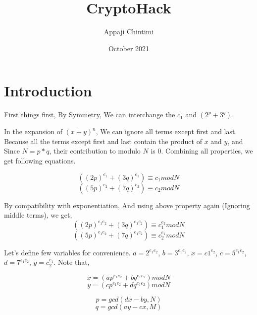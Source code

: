 \documentclass{article}
\title{CryptoHack}
\author{Appaji Chintimi}
\date{October 2021}
\begin{document}
\maketitle

\section{Introduction}

First things first, By Symmetry, We can interchange the $c_1$ and $(2^p + 3^q)$.

In the expansion of $(x + y)^n$, We can ignore all terms except first and last. Because all the terms except first and last contain the product of $x$ and $y$, and Since $N = p * q$, their contribution to modulo $N$ is $0$. Combining all properties, we get following equations.

\begin{equation}
    ((2p)^{e_1} + (3q)^{e_1})  \equiv c_1 mod N
\end{equation}
\begin{equation}
    ((5p)^{e_2} + (7q)^{e_2})  \equiv c_2 mod N
\end{equation}

By compatibility with exponentiation, And using above property again (Ignoring middle terms), we get,
\begin{equation}
    ((2p)^{e_1e_2} + (3q)^{e_1e_2})  \equiv c_1^{e_2} mod N
\end{equation}
\begin{equation}
    ((5p)^{e_1e_2} + (7q)^{e_1e_2})  \equiv c_2^{e_1} mod N
\end{equation}

Let's define few variables for convenience. $a = 2^{e_1e_2}$, $b = 3^{e_1e_2}$, $x = c1^{e_2}$, $c = 5^{e_1e_2}$, $d = 7^{e_1e_2}$, $y = c_2^{e_1}$. Note that,

\begin{equation*}
    x = (ap^{e_1e_2} + bq^{e_1e_2}) mod N
\end{equation*}
\begin{equation*}
    y = (cp^{e_1e_2} + dq^{e_1e_2}) mod N
\end{equation*}

\begin{equation*}
    p = gcd(dx - by, N)
\end{equation*}
\begin{equation*}
    q = gcd(ay - cx, M)
\end{equation*}
\end{document}
